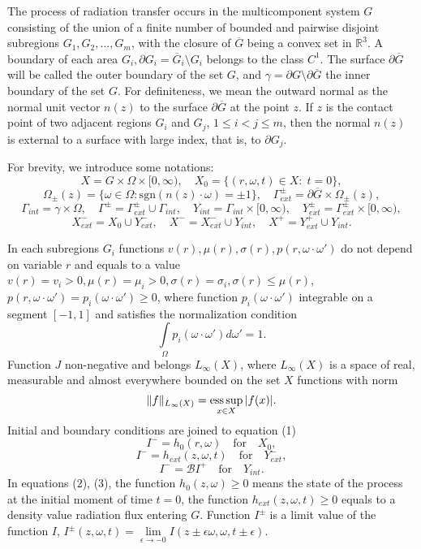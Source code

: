 \documentclass[12pt,reqno]{report}
\def\sgn{\mathrm{sgn}}
\begin{document}
The process of radiation transfer occurs in the multicomponent system $G$ consisting of the union of a finite number of bounded and pairwise disjoint subregions $G_1, G_2, ..., G_m$, with the closure of $\overline{G} $ being a convex set in $\mathbb{R}^3 $. A boundary of each area $G_i, \partial G_i = \overline{G} _i \setminus G_i$ belongs to the class $C^1$. The surface $\partial \overline{G} $ will be called the outer boundary of the set $G$, and $\gamma = \partial G \setminus \partial \overline{G} $ the inner boundary of the set $G$. For definiteness, we mean the outward normal as the normal unit vector $n(z)$ to the surface $\partial \overline{G}$ at the point $z$. If $z$ is the contact point of two adjacent regions $G_i$ and $G_j$, $ 1 \leq i < j \leq m $, then the normal $n(z)$ is external to a surface with large index, that is, to $\partial{G_j} $.

For brevity, we introduce some notations:
$$
X=G\times \Omega \times [0,\infty), \quad X_0=\{(r,\omega,t)\in
X:\; t=0 \}, 
$$
$$
\Omega_{\pm}(z)= \{ \omega \in \Omega : \sgn (n(z) \cdot
\omega)=\pm 1\}, \quad \Gamma^{\pm}_{ext} =
\partial \overline{G} \times \Omega_{\pm}(z), 
$$
$$
 \Gamma_{int}=\gamma \times \Omega, \quad
\Gamma^{\pm}=\Gamma^{\pm}_{ext}\cup \Gamma_{int},
\quad
Y_{int}=\Gamma_{int}\times[0,\infty), \quad
Y^{\pm}_{ext}=\Gamma^{\pm}_{ext}\times [0,\infty), 
$$
$$
X^{-}_{ext}=X_0 \cup Y^{-}_{ext}, \quad  X^{-}=X^{-}_{ext}\cup Y_{int},
\quad X^{+}=Y^{+}_{ext}\cup Y_{int}.
$$

In each subregions $G_i$ functions $v(r),\mu(r), \sigma(r),
p(r,\omega \cdot \omega')$ do not depend on variable $r$ and
equals to a value $v(r)=v_i>0, \mu(r)=\mu_i > 0,
\sigma(r)=\sigma_i, \sigma(r) \leq \mu(r)$, $p(r,\omega \cdot
\omega')=p_i(\omega \cdot \omega') \geq 0$, where function
$p_i(\omega \cdot \omega')$ integrable on a segment $[-1,1]$ 
and satisfies the normalization condition
$$
\int \limits_{\Omega} p_i(\omega \cdot \omega') d\omega'=1.
$$
Function $J$ non-negative and belongs $L_{\infty}(X)$, where
$L_{\infty}(X)$ is a space of real, measurable and almost everywhere bounded on the set $X$ functions
with norm
$$
\|f\|_{L_{\infty}(X)}=
\mathop{\fam0 ess\,sup} \limits_{x \in X} |f(x)|.
$$
Initial and boundary conditions are joined to equation (1)
\begin{equation}
I^- =h_0(r,\omega) \quad \text{for} \quad X_0,
\end{equation}
\begin{equation}
I^-= h_{ext}(z,\omega,t) \quad \text{for} \quad Y^-_{ext},
\end{equation}
\begin{equation}
I^-=\mathcal BI^+ \quad \text{for}\quad Y_{int}.
\end{equation}
In equations (2), (3), the function $h_0(z,\omega)\geq 0$
means the state of the process at the initial moment of time $t = 0$,
the function $h_{ext}(z,\omega,t) \geq 0 $ equals to a density value
radiation flux entering $G$. Function $I^{\pm}$ is a limit value of the function
$I$, $I^{\pm}(z,\omega,t)= \lim
\limits_{\epsilon \to -0} I(z \pm \epsilon \omega, \omega,t \pm
\epsilon)$. 
\end{document}
